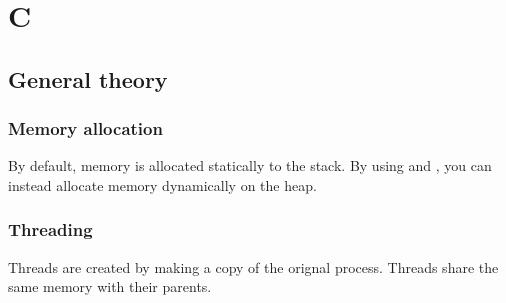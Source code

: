 \section{C}

\subsection{General theory}

\subsubsection{Memory allocation}
By default, memory is allocated statically to the stack. By using  and , you can instead allocate memory dynamically on the heap.

\subsubsection{Threading}
Threads are created by making a copy of the orignal process.
Threads share the same memory with their parents.



